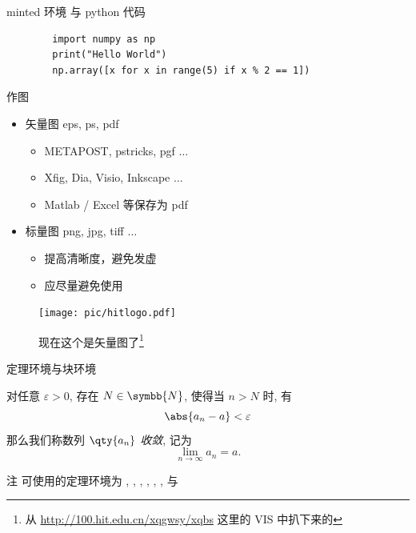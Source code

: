 \documentclass{beamer}
\begin{document}
\begin{frame}[fragile]{minted 环境 与 python 代码}
    \begin{verbatim}
        import numpy as np
        print("Hello World")
        np.array([x for x in range(5) if x % 2 == 1])
    \end{verbatim}
\end{frame}

\begin{frame}{作图}
    \begin{itemize}
        \item 矢量图 eps, ps, pdf
        \begin{itemize}
            \item METAPOST, pstricks, pgf $\ldots$
            \item Xfig, Dia, Visio, Inkscape $\ldots$
            \item Matlab / Excel 等保存为 pdf
        \end{itemize}
        \item 标量图 png, jpg, tiff $\ldots$
        \begin{itemize}
            \item 提高清晰度，避免发虚
            \item 应尽量避免使用
        \end{itemize}
    \end{itemize}
    \begin{figure}[htpb]
        \centering
        \texttt{[image: pic/hitlogo.pdf]}
        \caption{现在这个是矢量图了\footnote{从 \url{http://100.hit.edu.cn/xqgwsy/xqbs} 这里的 VIS 中扒下来的}}
    \end{figure}
    
\end{frame}

\begin{frame}{定理环境与块环境}
    \begin{definition}[数列极限]
        对任意 $ \varepsilon>0 $, 存在 $ N\in\symbb{N} $, 使得当 $ n>N $ 时, 有
        \[
            \abs{a_{n}-a}<\varepsilon
        \]   
        那么我们称数列 $ \qty{a_{n}} $ \emph{收敛}, 记为
        \[
            \lim_{n\to\infty}a_{n}=a.
        \]
    \end{definition}
    \begin{block}{注}
        可使用的定理环境为 , , , , , , 与   
    \end{block}
\end{frame}
\end{document}
